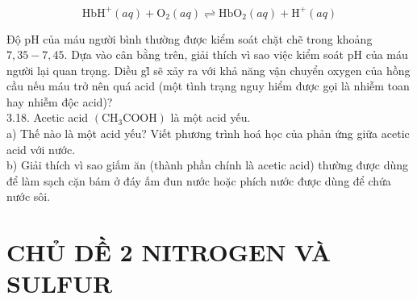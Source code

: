 \documentclass[10pt]{article}
\begin{document}
$$
\mathrm{HbH}^{+}(a q)+\mathrm{O}_{2}(a q) \rightleftharpoons \mathrm{HbO}_{2}(a q)+\mathrm{H}^{+}(a q)
$$

Độ pH của máu người bình thường được kiểm soát chặt chẽ trong khoảng $7,35-7,45$. Dựa vào cân bằng trên, giải thích vì sao việc kiểm soát pH của máu người lại quan trọng. Diều gl̉ sẽ xảy ra với khả năng vận chuyển oxygen của hồng cầu nếu máu trở nên quá acid (một tình trạng nguy hiểm được gọi là nhiễm toan hay nhiễm độc acid)?\\
3.18. Acetic acid $\left(\mathrm{CH}_{3} \mathrm{COOH}\right)$ là một acid yếu.\\
a) Thế nào là một acid yếu? Viết phương trình hoá học của phản ứng giữa acetic acid với nước.\\
b) Giải thích vì sao giấm ăn (thành phần chính là acetic acid) thường được dùng để làm sạch cặn bám ở đáy ấm đun nước hoặc phích nước được dùng để chứa nước sôi.

\section*{CHỦ DỀ 2 NITROGEN VÀ SULFUR}
\end{document}
